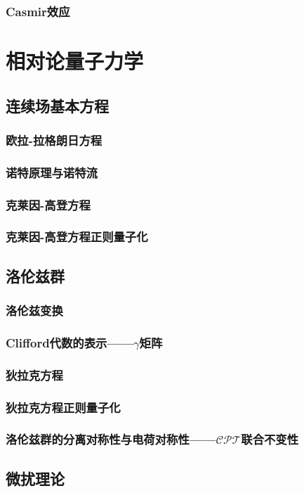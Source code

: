 \documentclass{book}
\begin{document}
\section{Casmir效应}
\part{相对论量子力学}
\chapter{连续场基本方程}
\section{欧拉-拉格朗日方程}
\section{诺特原理与诺特流}
\section{克莱因-高登方程}
\section{克莱因-高登方程正则量子化}
\chapter{洛伦兹群}
\section{洛伦兹变换}
\section{Clifford代数的表示——$\gamma$矩阵}
\section{狄拉克方程}
\section{狄拉克方程正则量子化}
\section{洛伦兹群的分离对称性与电荷对称性——$\mathcal{CPT}$联合不变性}
\chapter{微扰理论}
\end{document}

